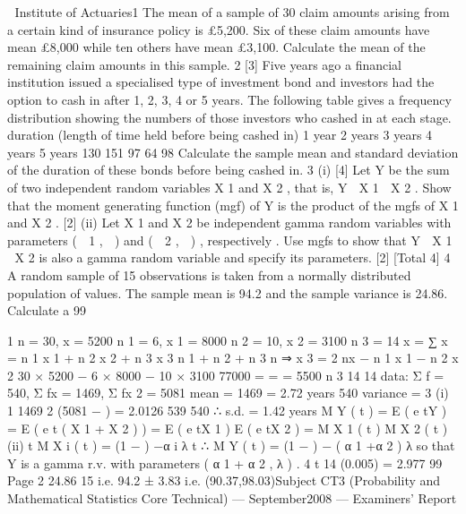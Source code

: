  Institute of Actuaries1
The mean of a sample of 30 claim amounts arising from a certain kind of insurance
policy is £5,200. Six of these claim amounts have mean £8,000 while ten others have
mean £3,100.
Calculate the mean of the remaining claim amounts in this sample.
2
[3]
Five years ago a financial institution issued a specialised type of investment bond and
investors had the option to cash in after 1, 2, 3, 4 or 5 years. The following table
gives a frequency distribution showing the numbers of those investors who cashed in
at each stage.
duration (length of time held before being cashed in)
1 year
2 years
3 years
4 years
5 years
130
151
97
64
98
Calculate the sample mean and standard deviation of the duration of these bonds
before being cashed in.
3
(i)
[4]
Let Y be the sum of two independent random variables X 1 and X 2 , that is,
Y  X 1  X 2 .
Show that the moment generating function (mgf) of Y is the product of the
mgfs of X 1 and X 2 .
[2]
(ii)
Let X 1 and X 2 be independent gamma random variables with parameters
(  1 ,  ) and (  2 ,  ) , respectively .
Use mgfs to show that Y  X 1  X 2 is also a gamma random variable and
specify its parameters.
[2]
[Total 4]
4
A random sample of 15 observations is taken from a normally distributed population
of values. The sample mean is 94.2 and the sample variance is 24.86.
Calculate a 99%

1
n = 30, x = 5200
n 1 = 6, x 1 = 8000
n 2 = 10, x 2 = 3100
n 3 = 14
x =
∑ x = n 1 x 1 + n 2 x 2 + n 3 x 3
n 1 + n 2 + n 3
n
⇒ x 3 =
2
nx − n 1 x 1 − n 2 x 2 30 × 5200 − 6 × 8000 − 10 × 3100 77000
=
=
= 5500
n 3
14
14
data: Σ f = 540, Σ fx = 1469, Σ fx 2 = 5081
mean =
1469
= 2.72 years
540
variance =
3
(i)
1
1469 2
(5081 −
) = 2.0126
539
540
∴ s.d. = 1.42 years
M Y ( t ) = E ( e tY ) = E ( e t ( X 1 + X 2 ) )
= E ( e tX 1 ) E ( e tX 2 ) = M X 1 ( t ) M X 2 ( t )
(ii)
t
M X i ( t ) = (1 − ) −α i
λ
t
∴ M Y ( t ) = (1 − ) − ( α 1 +α 2 )
λ
so that Y is a gamma r.v. with parameters ( α 1 + α 2 , λ ) .
4
t 14 (0.005) = 2.977
99%
Page 2
24.86
15
i.e. 94.2 ± 3.83 i.e. (90.37,98.03)Subject CT3 (Probability and Mathematical Statistics Core Technical) — September2008 — Examiners’ Report
